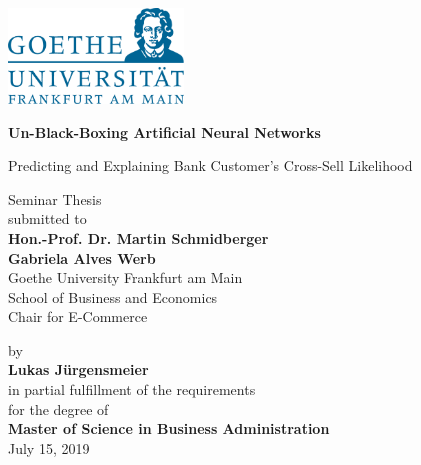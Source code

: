 \documentclass[12pt,a4paper]{article}
\begin{document}
\begin{center}
 \includegraphics[width=0.35\textwidth]{GU-Logo-blau-CMYK.eps} \vspace{2cm}
  
{\large{\bf Un-Black-Boxing Artificial Neural Networks}}

{\large{Predicting and Explaining Bank Customer's Cross-Sell Likelihood}} \vspace{0.5cm}


  Seminar Thesis \\\vspace{2cm}
  submitted to \\\vspace{0.5cm}
  \textbf{Hon.-Prof. Dr. Martin Schmidberger} \\
  \textbf{Gabriela Alves Werb} \\\vspace{0.5cm}
  Goethe University Frankfurt am Main \\
  School of Business and Economics \\
  Chair for E-Commerce \vspace{2cm}
  
  by \\\vspace{0.5cm}
  \textbf{Lukas J\"urgensmeier} \\
  
  \medskip
  \medskip
  in partial fulfillment of the requirements \\
  for the degree of \\\vspace{0.5cm}
  \textbf{Master of Science in Business Administration} \\\vspace{0.5cm}
  July 15, 2019
  
\end{center}


\pagebreak
\pagestyle{plain}
\tableofcontents
\pagebreak
\listoffigures
\listoftables
\newpage
{}
 
\end{document}
